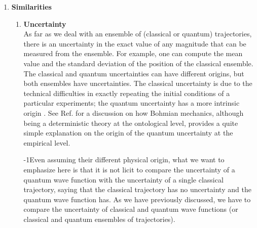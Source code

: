 \documentclass[nofootinbib, secnumarabic, amsmath, nobibnotes,11pt,aps,pra, floatfix]{revtex4-1}
\newcommand{\fref}[1]{Fig. \ref{#1}}
\newcommand{\eref}[1]{Eq. (\ref{#1})}
\begin{document}
\begin{enumerate}
\begin{enumerate}
{\quad}This surprising result for quantum mechanics can  be
illustrated with the double-slit experiment \cite{om.Dewdney}. We  assume that the initial wave functions
for the classical and quantum ensembles are identical at $t_0 = 0$.
Their difference appears in the time evolution of the trajectories.
For the quantum trajectories of the ensemble, the shape of the
ensemble (whether particles are stopped or not by the double-slit
screen) determines the shape of $R(x,t)$, which will affect the
dynamics of each trajectory, even those trajectories
that are far from the slit (see \fref{om_fig_dobleslit}a). On the
contrary, the classical Hamilton--Jacobi equation,
\eref{om.hamilton_jacobi1D}, is totally independent of $R(x,t)$, so
a single trajectory is completely independent from the rest of
trajectories of other experiments as seen in \fref{om_fig_dobleslit}b.
\end{enumerate}
\item \textbf{Similarities}
\begin{enumerate}
\item \textbf{Uncertainty} \\ As far as we deal with an ensemble of (classical or quantum) trajectories, there is an uncertainty in the exact value of any magnitude that can be measured from the ensemble. For example, one can compute the mean value and the standard deviation of the position of the classical ensemble. The classical and quantum uncertainties can have different origins, but both ensembles have uncertainties. The classical uncertainty is due to the technical difficulties in exactly repeating the initial conditions of a particular experiments; the quantum uncertainty has a more intrinsic origin  \cite{om.extra2,om.extra9}. See Ref. \cite{om.randomness} for a discussion on how Bohmian mechanics, although being a deterministic theory at the ontological level, provides a quite simple explanation on the origin of the quantum uncertainty at the empirical level. 

{\quad}\looseness-1Even assuming their different physical origin, what we want to
emphasize here is  that it is not licit to compare the uncertainty
of a quantum wave function with the uncertainty of a single
classical trajectory, saying that the classical trajectory has no
uncertainty and the quantum wave function has. As we have previously discussed,
we have to compare the uncertainty of classical and quantum wave
functions (or classical and quantum ensembles of trajectories).


\end{enumerate}
\end{enumerate}
\end{document}

